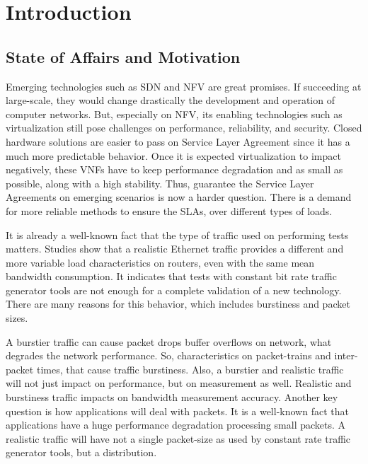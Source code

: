 \chapter{Introduction}\label{ch:introduction}

\section{State of Affairs and Motivation}\label{sec:state-of-the-art}

Emerging technologies such as SDN and NFV are great promises. If succeeding at large-scale, they would change drastically the development and operation of computer networks. But, especially on NFV, its enabling technologies such as virtualization still pose challenges on performance,  reliability, and security\cite{nfv-challenges}. Closed hardware solutions are easier to pass on Service Layer Agreement since it has a much more predictable behavior. Once it is expected virtualization to impact negatively, these VNFs have to keep performance degradation and as small as possible, along with a high stability. Thus, guarantee the Service Layer Agreements on emerging scenarios is now a harder question. There is a demand for more reliable methods to ensure the SLAs, over different types of loads.

It is already a well-known fact that the type of traffic used on performing tests matters. Studies show that a realistic Ethernet traffic provides a different and more variable load characteristics on routers\cite{harpoon-validation}, even with the same mean bandwidth consumption. It indicates that tests with constant bit rate traffic generator tools are not enough for a complete validation of a new technology. There are many reasons for this behavior, which includes burstiness and packet sizes.

A burstier traffic can cause packet drops buffer overflows on network\cite{burstiness-queue-lenght}\cite{modelling-of-self-similar}\cite{empirical-interarrival-study}, what degrades the network performance. So, characteristics on packet-trains and inter-packet times, that cause traffic burstiness. Also, a burstier and realistic traffic will not just impact on performance, but on measurement as well. Realistic and burstiness traffic impacts on bandwidth measurement accuracy\cite{legotg-paper}\cite{background-traffic-matter}. Another key question is how applications will deal with packets. It is a well-known fact that applications have a huge performance degradation processing small packets\cite{comparative-trafficgen-tools}. A realistic traffic will have not a single packet-size as used by constant rate traffic generator tools, but a distribution\cite{packet-distribution-model}. 

